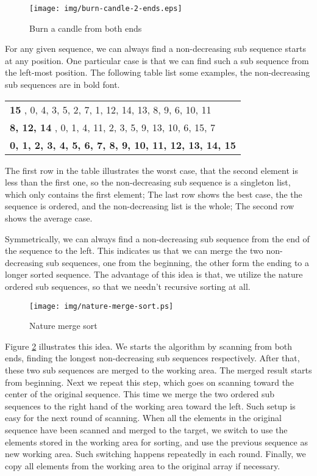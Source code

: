 \documentclass[UTF8]{article}
\begin{document}
\begin{figure}[htbp]
 \centering
 \texttt{[image: img/burn-candle-2-ends.eps]}
 \caption{Burn a candle from both ends}
 \label{fig:burn-candle}
\end{figure}

For any given sequence, we can always find a non-decreasing sub sequence starts at any position.
One particular case is that we can find such a sub sequence from the left-most position. The following
table list some examples, the non-decreasing sub sequences are in bold font.

\begin{tabular}{ | l |}
\hline
{\bf 15 } , 0, 4, 3, 5, 2, 7, 1, 12, 14, 13, 8, 9, 6, 10, 11 \\
{\bf 8, 12, 14 }, 0, 1, 4, 11, 2, 3, 5, 9, 13, 10, 6, 15, 7 \\
{\bf 0, 1, 2, 3, 4, 5, 6, 7, 8, 9, 10, 11, 12, 13, 14, 15 } \\
\hline
\end{tabular}

The first row in the table illustrates the worst case, that the second element is less than the first one,
so the non-decreasing sub sequence is a singleton list, which only contains the first element;
The last row shows the best case, the the sequence is ordered, and the non-decreasing list is the whole;
The second row shows the average case.

Symmetrically, we can always find a non-decreasing sub sequence from the end of the sequence
to the left. This indicates us that we can merge the two non-decreasing sub sequences, one
from the beginning, the other form the ending to a longer sorted sequence. The advantage of
this idea is that, we utilize the nature ordered sub sequences, so that we needn't recursive
sorting at all.

\begin{figure}[htbp]
 \centering
 \texttt{[image: img/nature-merge-sort.ps]}
 \caption{Nature merge sort}
 \label{fig:nature-merge-sort}
\end{figure}

Figure \ref{fig:nature-merge-sort} illustrates this idea. We starts the algorithm by scanning
from both ends, finding the longest non-decreasing sub sequences respectively. After that,
these two sub sequences are merged to the working area. The merged result starts from beginning.
Next we repeat this step, which goes on scanning toward the center of the original sequence.
This time we merge the two ordered sub sequences to the right hand of the working area toward
the left. Such setup is easy for the next round of scanning. When all the elements
in the original sequence have been scanned and merged to the target, we switch to use the
elements stored in the working area for sorting, and use the previous sequence as new working area.
Such switching happens repeatedly in each round. Finally, we copy all elements from the
working area to the original array if necessary.
\end{document}
